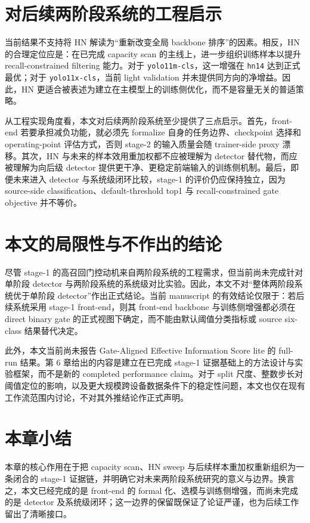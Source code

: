 \documentclass[UTF8,openany,12pt]{ctexbook}
\begin{document}
\section{对后续两阶段系统的工程启示}
当前结果不支持将 HN 解读为“重新改变全局 backbone 排序”的因素。相反，HN 的合理定位应是：在已完成 capacity scan 的主线上，进一步组织训练样本以提升 recall-constrained filtering 能力。对于 \texttt{yolo11m-cls}，这一增强在 \texttt{hn14} 达到正式最优；对于 \texttt{yolo11x-cls}，当前 light validation 并未提供同方向的净增益。因此，HN 更适合被表述为建立在主模型上的训练侧优化，而不是容量无关的普适策略。

从工程实现角度看，本文对后续两阶段系统至少提供了三点启示。首先，front-end 若要承担减负功能，就必须先 formalize 自身的任务边界、checkpoint 选择和 operating-point 评估方式，否则 stage-2 的输入质量会随 trainer-side proxy 漂移。其次，HN 与未来的样本效用重加权都不应被理解为 detector 替代物，而应被理解为向后级 detector 提供更干净、更稳定前端输入的训练侧机制。最后，即便未来进入 detector 与系统级闭环比较，stage-1 的评价仍应保持独立，因为 source-side classification、default-threshold top1 与 recall-constrained gate objective 并不等价。

\section{本文的局限性与不作出的结论}
尽管 stage-1 的高召回门控动机来自两阶段系统的工程需求，但当前尚未完成针对单阶段 detector 与两阶段系统的系统级对比实验。因此，本文不对“整体两阶段系统优于单阶段 detector”作出正式结论。当前 manuscript 的有效结论仅限于：若后续系统采用 stage-1 front-end，则其 front-end backbone 与训练侧增强都必须在 direct binary gate 的正式视图下确定，而不能由默认阈值分类指标或 source six-class 结果替代决定。

此外，本文当前尚未报告 Gate-Aligned Effective Information Score lite 的 full-run 结果。第 6 章给出的内容是建立在已完成 stage-1 证据基础上的方法设计与实验框架，而不是新的 completed performance claim。对于 split 尺度、整数步长对阈值定位的影响，以及更大规模跨设备数据条件下的稳定性问题，本文也仅在现有工作流范围内讨论，不对其外推结论作正式声明。

\section{本章小结}
本章的核心作用在于把 capacity scan、HN sweep 与后续样本重加权重新组织为一条闭合的 stage-1 证据链，并明确它对未来两阶段系统研究的意义与边界。换言之，本文已经完成的是 front-end 的 formal 化、选模与训练侧增强，而尚未完成的是 detector 及系统级闭环；这一边界的保留既保证了论证严谨，也为后续工作留出了清晰接口。
\end{document}

